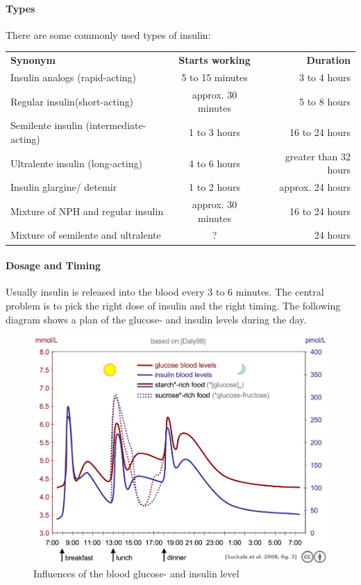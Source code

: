 \documentclass[pdflatex,a4paper,11pt,english]{scrreprt}
\begin{document}
\newpage

\paragraph {Types}
There are some commonly used types of insulin: \\

\begin{tabular}{lcr}
	\textbf{Synonym} & \textbf{Starts working} & \textbf{Duration}\\
	Insulin analogs (rapid-acting) & 5 to 15 minutes & 3 to 4 hours\\
	Regular insulin(short-acting) & approx. 30 minutes & 5 to 8 hours\\
	Semilente insulin (intermediate-acting) & 1 to 3 hours & 16 to 24 hours\\
	Ultralente insulin (long-acting) & 4 to 6 hours & greater than 32 hours\\
	Insulin glargine/ detemir & 1 to 2 hours & approx. 24 hours\\
	Mixture of NPH and regular insulin & approx. 30 minutes & 16 to 24 hours\\
	Mixture of semilente and ultralente & ? & 24 hours\\
\end{tabular}

\paragraph{Dosage and Timing}
Usually insulin is released into the blood every 3 to 6 minutes. The central problem is to pick the right dose of insulin and the right timing. The following diagram shows a plan of the glucose- and insulin levels during the day.

\begin{figure}[htb]
\centering
\includegraphics[width=\textwidth]{images/Suckale08_fig3_glucose_insulin_day}
\caption{Influences of the blood glucose- and insulin level}
\end{figure}
\end{document}
